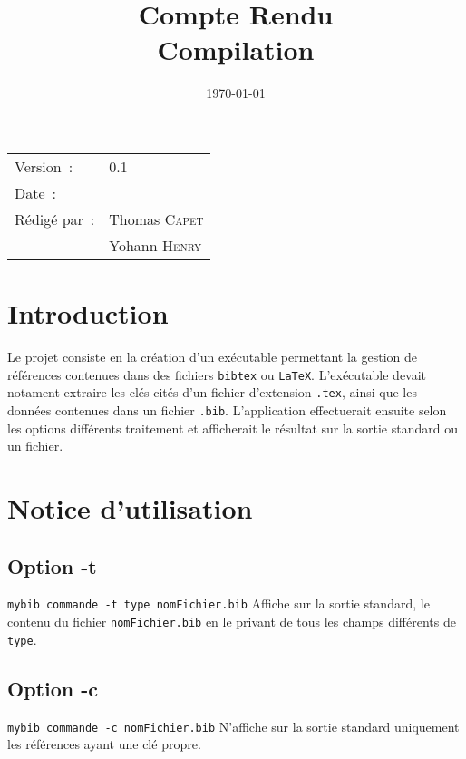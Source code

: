 \documentclass[hidelinks, a4paper,11pt,twoside,final]{article}
\title{\bfseries Compte Rendu \\ Compilation}
\begin{document}
\maketitle
\begin{center}
\begin{tabular}{ll}
  Version~: & 0.1\\[.5em]
  Date~: & \date{\today}\\[.5em]
  Rédigé par~: & Thomas \textsc{Capet}\\
               & Yohann \textsc{Henry}\\
\end{tabular}
\end{center}

\newpage

\newpage
\tableofcontents

\newpage

\section{Introduction}
Le projet consiste en la création d'un exécutable permettant la gestion de références contenues dans des fichiers \texttt{bibtex} ou \texttt{LaTeX}.
L'exécutable devait notament extraire les clés cités d'un fichier d'extension \texttt{.tex}, ainsi que les données contenues dans un fichier \texttt{.bib}.
L'application effectuerait ensuite selon les options différents traitement et afficherait le résultat sur la sortie standard ou un fichier.

\section{Notice d'utilisation}
\subsection{Option -t}
\texttt{mybib commande -t type nomFichier.bib}
\newline
Affiche sur la sortie standard, le contenu du fichier \texttt{nomFichier.bib} 
en le privant de tous les champs différents de \texttt{type}.

\subsection{Option -c}
\texttt{mybib commande -c nomFichier.bib}
\newline
N'affiche sur la sortie standard uniquement les références ayant une clé propre.
\end{document}
